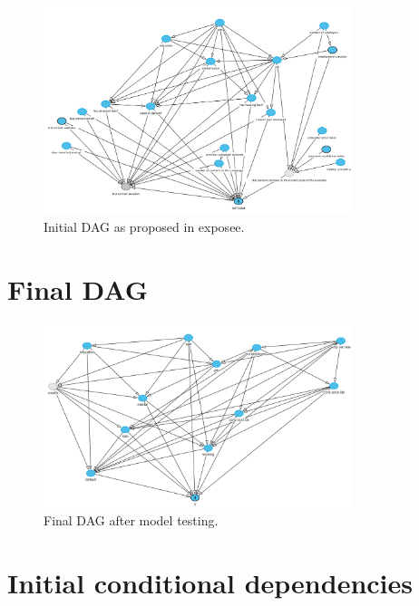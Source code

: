 \documentclass[11pt,]{article}
\begin{document}
\label{sec:initial_dag}

\begin{figure}[h]
    \centering
    \includegraphics[width=0.8\textwidth]{images/initial_dag}
    \caption{Initial DAG as proposed in exposee.}
    \label{fig:initial_dag}
\end{figure}

\hypertarget{final-dag}{%
\section{Final DAG}\label{final-dag}}

\label{sec:final_dag}

\begin{figure}[h]
    \centering
    \includegraphics[width=0.8\textwidth]{images/final_dag}
    \caption{Final DAG after model testing.}
    \label{fig:final_dag}
\end{figure}

\newpage

\hypertarget{initial-conditional-dependencies}{%
\section{Initial conditional
dependencies}\label{initial-conditional-dependencies}}
\end{document}

